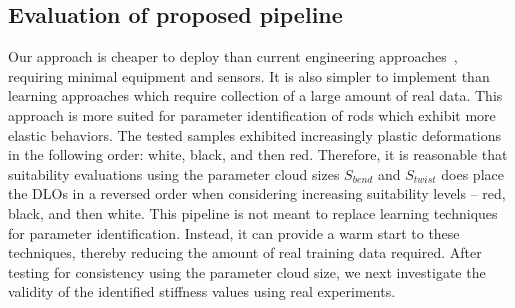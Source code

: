 \documentclass[letterpaper, 10 pt, conference]{ieeeconf}  %
\begin{document}
\begin{table}[h]
	\caption{Parameter cloud size for each experiment}
	\vspace{-0.2cm}
	\label{table:paramiden}
	\begin{center}
		\end{center}
	\vspace{-0.3cm}
\end{table}

\subsection{Evaluation of proposed pipeline}
Our approach is cheaper to deploy than current engineering approaches~\cite{bartholdt2021parameter,liu2023robotic}, requiring minimal equipment and sensors. It is also simpler to implement than learning approaches \cite{caldwell2014optimal} which require collection of a large amount of real data. This approach is more suited for parameter identification of rods which exhibit more elastic behaviors. The tested samples exhibited increasingly plastic deformations in the following order: white, black, and then red. Therefore, it is reasonable that suitability evaluations using the parameter cloud sizes $S_{bend}$ and $S_{twist}$ does place the DLOs in a reversed order when considering increasing suitability levels -- red, black, and then white. This pipeline is not meant to replace learning techniques for parameter identification. Instead, it can provide a warm start to these techniques, thereby reducing the amount of real training data required. After testing for consistency using the parameter cloud size, we next investigate the validity of the identified stiffness values using real experiments.
\end{document}
